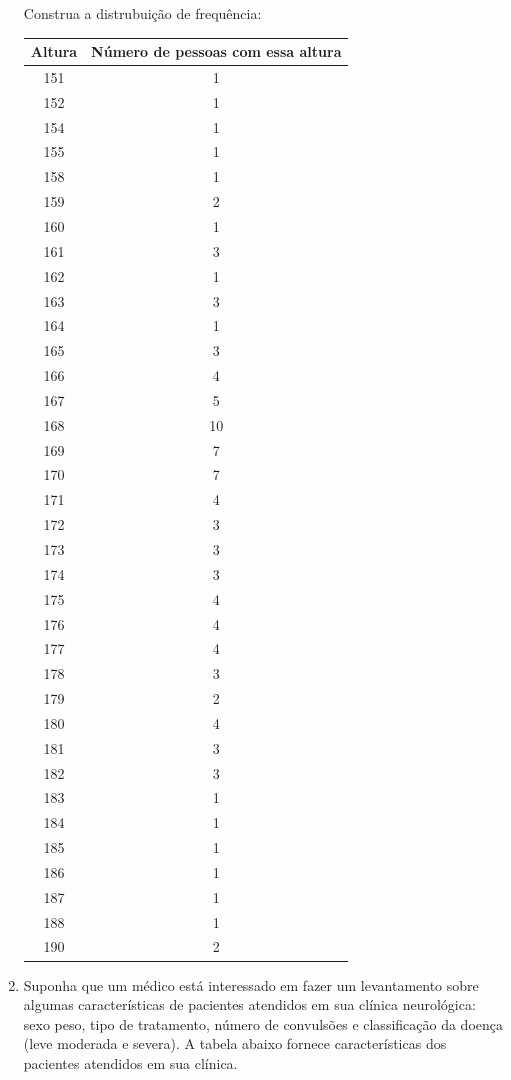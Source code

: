 \documentclass[a4paper, 12pt]{article}
\begin{document}
\begin{enumerate}
  Construa a distrubuição de frequência:
  \begin{tabular}{c | c }
    Altura & Número de pessoas com essa altura \\
    \hline
    151 & 1 \\
    152 & 1 \\
    154 & 1 \\
    155 & 1 \\
    158 & 1 \\
    159 & 2 \\
    160 & 1 \\
    161 & 3 \\
    162 & 1 \\
    163 & 3 \\
    164 & 1 \\
    165 & 3 \\
    166 & 4 \\
    167 & 5 \\
    168 & 10 \\
    169 & 7 \\
    170 & 7 \\
    171 & 4 \\
    172 & 3 \\
    173 & 3 \\
    174 & 3 \\
    175 & 4 \\
    176 & 4 \\
    177 & 4 \\
    178 & 3 \\
    179 & 2 \\
    180 & 4 \\
    181 & 3 \\
    182 & 3 \\
    183 & 1 \\
    184 & 1 \\
    185 & 1 \\
    186 & 1 \\
    187 & 1 \\
    188 & 1 \\
    190 & 2 \\    
  \end{tabular}
\newpage
\item Suponha que um médico está interessado em fazer um levantamento sobre algumas características de pacientes atendidos em sua clínica neurológica: sexo peso, tipo de tratamento, número de convulsões e classificação da doença (leve moderada e severa). A tabela abaixo fornece características dos pacientes atendidos em sua clínica. \\\\

\end{enumerate}
\end{document}

